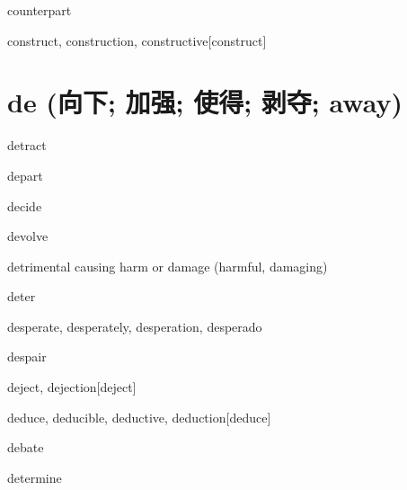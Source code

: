 \begin{RefWord}{counterpart}
\end{RefWord}

\begin{RefWord}{construct, construction, constructive}[construct]
\end{RefWord}



\section{de (向下; 加强; 使得; 剥夺; away)}

\begin{RefWord}{detract}
\end{RefWord}

\begin{RefWord}{depart}
\end{RefWord}

\begin{RefWord}{decide}
\end{RefWord}

\begin{RefWord}{devolve}
\end{RefWord}

\begin{RefWord}{detrimental}
    causing harm or damage (harmful, damaging)
\end{RefWord}

\begin{RefWord}{deter}
\end{RefWord}

\begin{RefWord}{desperate, desperately, desperation, desperado}
\end{RefWord}

\begin{RefWord}{despair}
\end{RefWord}

\begin{RefWord}{deject, dejection}[deject]
\end{RefWord}

\begin{RefWord}{deduce, deducible, deductive, deduction}[deduce]
\end{RefWord}

\begin{RefWord}{debate}
\end{RefWord}

\begin{RefWord}{determine}
\end{RefWord}

